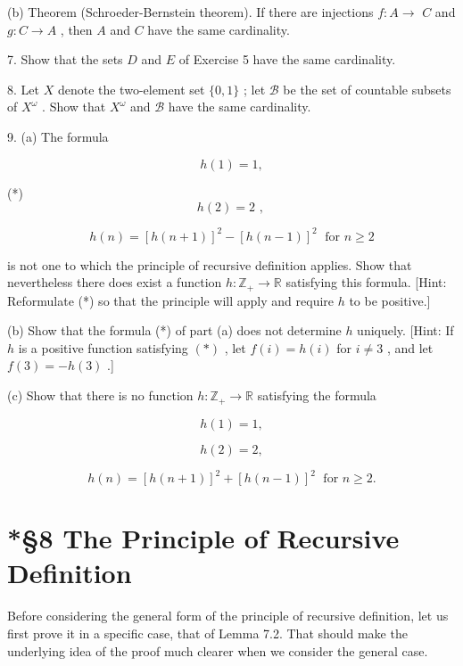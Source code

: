 (b) Theorem (Schroeder-Bernstein theorem). If there are injections \(f : A \rightarrow\)  \(C\) and \(g : C \rightarrow  A\) , then \(A\) and \(C\) have the same cardinality.

7. Show that the sets \(D\) and \(E\) of Exercise 5 have the same cardinality.

8. Let \(X\) denote the two-element set \(\{ 0,1\}\) ; let \(\mathcal{B}\) be the set of countable subsets of \({X}^{\omega }\) . Show that \({X}^{\omega }\) and \(\mathcal{B}\) have the same cardinality.

9. (a) The formula

\[
h\left( 1\right)  = 1,
\]

(*)
\[
h\left( 2\right)  = 2\text{ , }
\]

\[
h\left( n\right)  = {\left\lbrack  h\left( n + 1\right) \right\rbrack  }^{2} - {\left\lbrack  h\left( n - 1\right) \right\rbrack  }^{2}\;\text{ for }n \geq  2
\]

is not one to which the principle of recursive definition applies. Show that nevertheless there does exist a function \(h : {\mathbb{Z}}_{ + } \rightarrow  \mathbb{R}\) satisfying this formula. [Hint: Reformulate (*) so that the principle will apply and require \(h\) to be positive.]

(b) Show that the formula (*) of part (a) does not determine \(h\) uniquely. [Hint: If \(h\) is a positive function satisfying \(\left( *\right)\) , let \(f\left( i\right)  = h\left( i\right)\) for \(i \neq  3\) , and let \(f\left( 3\right)  =  - h\left( 3\right)\) .]

(c) Show that there is no function \(h : {\mathbb{Z}}_{ + } \rightarrow  \mathbb{R}\) satisfying the formula

\[
h\left( 1\right)  = 1,
\]

\[
h\left( 2\right)  = 2,
\]

\[
h\left( n\right)  = {\left\lbrack  h\left( n + 1\right) \right\rbrack  }^{2} + {\left\lbrack  h\left( n - 1\right) \right\rbrack  }^{2}\;\text{ for }n \geq  2.
\]

\section*{*§8 The Principle of Recursive Definition}

Before considering the general form of the principle of recursive definition, let us first prove it in a specific case, that of Lemma 7.2. That should make the underlying idea of the proof much clearer when we consider the general case.

